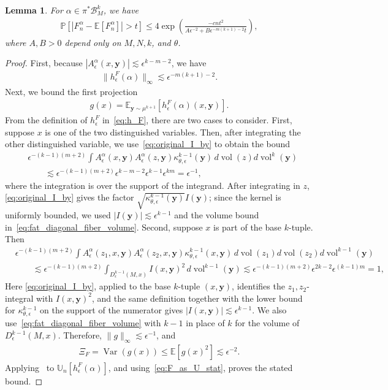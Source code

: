 \documentclass[11pt,reqno]{amsproc}
\numberwithin{equation}{section}
\newcommand{\E}{\mathbb{E}}
\newcommand{\U}{\mathbb{U}}
\newcommand{\PP}{\mathbb{P}}
\newcommand{\by}{\mathbf{y}}
\newcommand{\cB}{\mathcal{B}}
\newcommand{\ls}{\lesssim}
\newcommand{\vol}{\operatorname{vol}}
\newcommand{\Var}{\operatorname{Var}}
\newtheorem{lemma}[counter]{Lemma}
\theoremstyle{definition}
\theoremstyle{plain}
\begin{document}
\begin{lemma} \label{lem:codiff_pointwise_variance}
    For $\alpha\in\pi^*\cB_M^k$, we have
    \begin{align}
        \PP[|F_n^\alpha-\E[F_n^\alpha]|>t]
        \leq 4\exp\left(\frac{-cnt^2}{A\epsilon^{-2}+B\epsilon^{-m(k+1)-2}t}\right),
    \end{align}
    where $A,B>0$ depend only on $M,N,k$, and $\theta$.
\end{lemma}
\begin{proof}
    First, because $|A^\alpha_\epsilon(x,\by)|\ls\epsilon^{k-m-2}$, we have
    \begin{align}
        \|h^F_\epsilon(\alpha)\|_\infty\ls \epsilon^{-m(k+1)-2}.
    \end{align}
    Next, we bound the first projection
    \begin{align}
        g(x)=\E_{\by\sim\mu^{k+1}}[h^F_\epsilon(\alpha)(x,\by)].
    \end{align}
    From the definition of $h^F_\epsilon$ in~\eqref{eq:h_F}, there are two cases to consider. First, suppose $x$ is one of the two distinguished variables. Then, after integrating the other distinguished variable, we use~\eqref{eq:original_I_by} to obtain the bound
    \begin{align}
        &\epsilon^{-(k-1)(m+2)}\int A^\alpha_\epsilon(x,\by)A^\alpha_\epsilon(z,\by)\kappa^{k-1}_{\theta,\epsilon}(\by)\,d\vol(z)d\vol^k(\by) \\
        &\qquad\ls \epsilon^{-(k-1)(m+2)}\epsilon^{k-m-2}\epsilon^{k-1}\epsilon^{km}=\epsilon^{-1},
    \end{align}
    where the integration is over the support of the integrand. After integrating in $z$, \eqref{eq:original_I_by} gives the factor $\sqrt{\kappa^{k-1}_{\theta,\epsilon}(\by)}I(\by)$; since the kernel is uniformly bounded, we used $|I(\by)|\ls\epsilon^{k-1}$ and the volume bound in~\eqref{eq:fat_diagonal_fiber_volume}. Second, suppose $x$ is part of the base $k$-tuple. Then
    \begin{align}
        &\epsilon^{-(k-1)(m+2)}\int A^\alpha_\epsilon(z_1,x,\by)A^\alpha_\epsilon(z_2,x,\by)\kappa^{k-1}_{\theta,\epsilon}(x,\by)\,d\vol(z_1)d\vol(z_2)d\vol^{k-1}(\by) \\
        &\qquad\ls \epsilon^{-(k-1)(m+2)}\int_{D^{k-1}_\epsilon(M,x)} I(x,\by)^2\,d\vol^{k-1}(\by)
        \ls \epsilon^{-(k-1)(m+2)}\epsilon^{2k-2}\epsilon^{(k-1)m}=1,
    \end{align}
    Here \eqref{eq:original_I_by}, applied to the base $k$-tuple $(x,\by)$, identifies the $z_1,z_2$-integral with $I(x,\by)^2$, and the same definition together with the lower bound for $\kappa^{k-1}_{\theta,\epsilon}$ on the support of the numerator gives $|I(x,\by)|\ls\epsilon^{k-1}$. We also use~\eqref{eq:fat_diagonal_fiber_volume} with $k-1$ in place of $k$ for the volume of $D^{k-1}_\epsilon(M,x)$. Therefore, $\|g\|_\infty\ls\epsilon^{-1}$, and
    \begin{align}
        \Xi_F=\Var(g(x))\leq \E[g(x)^2]\ls\epsilon^{-2}.
    \end{align}
    Applying~ to $\U_n[h^F_\epsilon(\alpha)]$, and using~\eqref{eq:F_as_U_stat}, proves the stated bound.
\end{proof}
\end{document}
